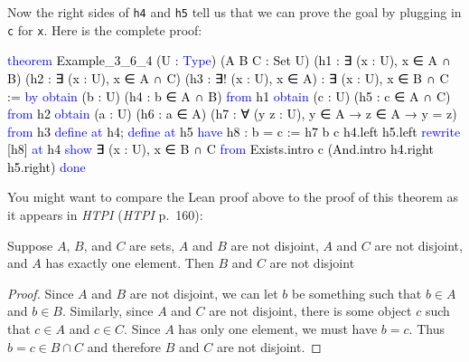 \documentclass[
  letterpaper,
  DIV=11,
  numbers=noendperiod]{scrreprt}
\newenvironment{Shaded}{\begin{snugshade}}{\end{snugshade}}
\newcommand{\KeywordTok}[1]{\textcolor[rgb]{0.00,0.23,0.31}{#1}}
\newcommand{\NormalTok}[1]{\textcolor[rgb]{0.00,0.23,0.31}{#1}}
\renewcommand{\NormalTok}[1]{\textcolor[HTML]{000000}{#1}}
\renewcommand{\KeywordTok}[1]{\textcolor[HTML]{0000FF}{#1}}
\newcommand{\excl}[1]{}
\theoremstyle{remark}
\begin{document}
Now the right sides of \texttt{h4} and \texttt{h5} tell us that we can
prove the goal by plugging in \texttt{c} for \texttt{x}. Here is the
complete proof:

\begin{Shaded}
\begin{Highlighting}[]
\KeywordTok{theorem}\NormalTok{ Example\_3\_6\_4 (U : }\KeywordTok{Type}\NormalTok{) (A B C : Set U)}
\NormalTok{    (h1 : ∃ (x : U), x ∈ A ∩ B)}
\NormalTok{    (h2 : ∃ (x : U), x ∈ A ∩ C)}
\NormalTok{    (h3 : ∃! (x : U), x ∈ A) :}
\NormalTok{    ∃ (x : U), x ∈ B ∩ C := }\KeywordTok{by}
  \KeywordTok{obtain}\NormalTok{ (b : U) (h4 : b ∈ A ∩ B) }\KeywordTok{from}\NormalTok{ h1}
  \KeywordTok{obtain}\NormalTok{ (c : U) (h5 : c ∈ A ∩ C) }\KeywordTok{from}\NormalTok{ h2}
  \KeywordTok{obtain}\NormalTok{ (a : U) (h6 : a ∈ A) (h7 : ∀ (y z : U),}
\NormalTok{    y ∈ A → z ∈ A → y = z)  }\KeywordTok{from}\NormalTok{ h3}
  \KeywordTok{define} \KeywordTok{at}\NormalTok{ h4; }\KeywordTok{define} \KeywordTok{at}\NormalTok{ h5}
  \KeywordTok{have}\NormalTok{ h8 : b = c := h7 b c h4.left h5.left}
  \KeywordTok{rewrite}\NormalTok{ [h8] }\KeywordTok{at}\NormalTok{ h4}
  \KeywordTok{show}\NormalTok{ ∃ (x : U), x ∈ B ∩ C }\KeywordTok{from}
\NormalTok{    Exists.intro c (And.intro h4.right h5.right)}
  \KeywordTok{done}
\end{Highlighting}
\end{Shaded}

You might want to compare the Lean proof above to the proof of this
theorem as it appears in \emph{HTPI} (\emph{HTPI} p.~160):

\begin{thm}
Suppose \(A\), \(B\), and \(C\) are sets, \(A\) and \(B\) are not
disjoint, \(A\) and \(C\) are not disjoint, and \(A\) has exactly one
element. Then \(B\) and \(C\) are not disjoint

\end{thm}

\begin{proof}

Since \(A\) and \(B\) are not disjoint, we can let \(b\) be something
such that \(b \in A\) and \(b \in B\). Similarly, since \(A\) and \(C\)
are not disjoint, there is some object \(c\) such that \(c \in A\) and
\(c \in C\). Since \(A\) has only one element, we must have \(b = c\).
Thus \(b = c \in B \cap C\) and therefore \(B\) and \(C\) are not
disjoint. \excl{~□}\qedhere

\end{proof}
\end{document}
